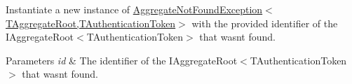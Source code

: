 Instantiate a new instance of \hyperlink{classCqrs_1_1Domain_1_1Exceptions_1_1AggregateNotFoundException_a44057befbb31c652727d04c5b34211ee_a44057befbb31c652727d04c5b34211ee}{Aggregate\+Not\+Found\+Exception$<$\+T\+Aggregate\+Root,\+T\+Authentication\+Token$>$} with the provided identifier of the I\+Aggregate\+Root$<$\+T\+Authentication\+Token$>$ that wasn\textquotesingle{}t found. 


\begin{DoxyParams}{Parameters}
{\em id} & The identifier of the I\+Aggregate\+Root$<$\+T\+Authentication\+Token$>$ that wasn\textquotesingle{}t found.\\
\hline
\end{DoxyParams}
